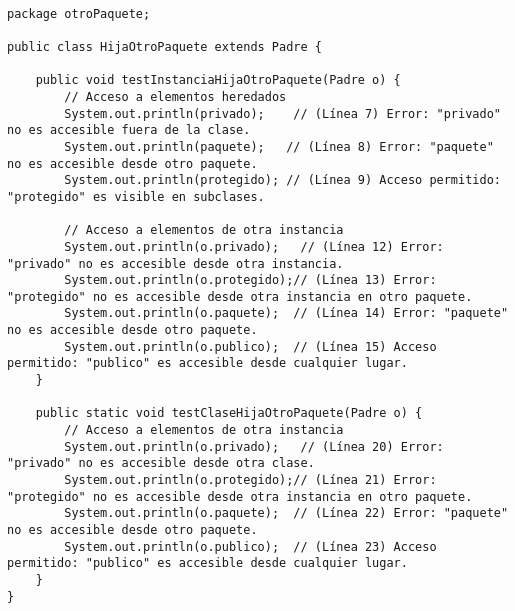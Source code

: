 \documentclass[a4paper,12pt]{article}
\begin{document}
\begin{lstlisting}[style=customjava]

package otroPaquete;

public class HijaOtroPaquete extends Padre {

    public void testInstanciaHijaOtroPaquete(Padre o) {
        // Acceso a elementos heredados
        System.out.println(privado);    // (Línea 7) Error: "privado" no es accesible fuera de la clase.
        System.out.println(paquete);   // (Línea 8) Error: "paquete" no es accesible desde otro paquete.
        System.out.println(protegido); // (Línea 9) Acceso permitido: "protegido" es visible en subclases.

        // Acceso a elementos de otra instancia
        System.out.println(o.privado);   // (Línea 12) Error: "privado" no es accesible desde otra instancia.
        System.out.println(o.protegido);// (Línea 13) Error: "protegido" no es accesible desde otra instancia en otro paquete.
        System.out.println(o.paquete);  // (Línea 14) Error: "paquete" no es accesible desde otro paquete.
        System.out.println(o.publico);  // (Línea 15) Acceso permitido: "publico" es accesible desde cualquier lugar.
    }

    public static void testClaseHijaOtroPaquete(Padre o) {
        // Acceso a elementos de otra instancia
        System.out.println(o.privado);   // (Línea 20) Error: "privado" no es accesible desde otra clase.
        System.out.println(o.protegido);// (Línea 21) Error: "protegido" no es accesible desde otra instancia en otro paquete.
        System.out.println(o.paquete);  // (Línea 22) Error: "paquete" no es accesible desde otro paquete.
        System.out.println(o.publico);  // (Línea 23) Acceso permitido: "publico" es accesible desde cualquier lugar.
    }
}
\end{lstlisting}
\end{document}
